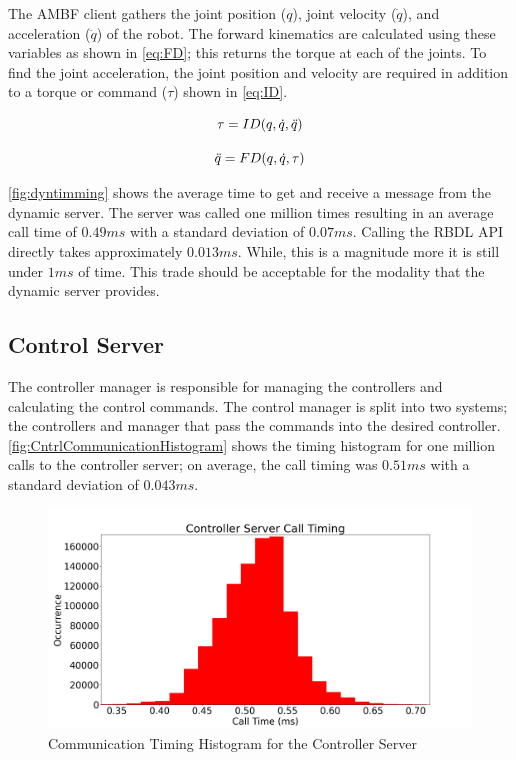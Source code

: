 The AMBF client gathers the joint position ($q$), joint velocity ($\Dot{q}$), and acceleration ($\DDot{q}$) of the robot.  The forward kinematics are calculated using these variables as shown in \autoref{eq:FD}; this returns the torque at each of the joints. To find the joint acceleration, the joint position and velocity are required in addition to a torque or command ($\tau$) shown in \autoref{eq:ID}.  

\begin{equation}
    \Large
    \tau = ID(q,\Dot{q}, \Ddot{q})
    \label{eq:ID}
\end{equation}


\begin{equation}
    \Large
    \Ddot{q} = FD(q,\Dot{q}, \tau )
    \label{eq:FD}
\end{equation}



\autoref{fig:dyntimming} shows the average time to get and receive a message from the dynamic server. The server was called one million times resulting in an average call time of $0.49ms$ with a standard deviation of $0.07ms$. Calling the RBDL API directly takes approximately $0.013ms$. While, this is a magnitude more it is still under $1ms$ of time. This trade should be acceptable for the modality that the dynamic server provides. 


 
 
 \subsection{Control Server}
 
 The controller manager is responsible for managing the controllers and calculating the control commands. The control manager is split into two systems; the controllers and manager that pass the commands into the desired controller. 
\autoref{fig:CntrlCommunicationHistogram} shows the timing histogram for one million calls to the controller server; on average, the call timing was $0.51ms$ with a standard deviation of $0.043ms$.  

 \begin{figure}
     \centering
     \includegraphics[scale=0.35]{images/software/control_loop_timing.png}
     \caption[Controller Server Timing Histogram]{Communication Timing Histogram for the Controller Server}
     \label{fig:CntrlCommunicationHistogram}
 \end{figure}



